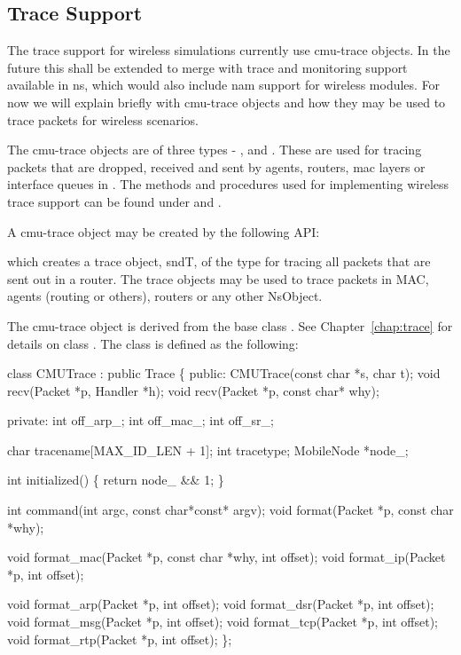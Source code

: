 \subsection{Trace Support}
\label{sec:mobile-trace}

The trace support for wireless simulations currently use cmu-trace
objects. In the future this shall be extended to merge with trace and
monitoring support available in ns, which would also include nam support
for wireless modules. For now we will explain briefly with cmu-trace
objects and how they may be used to trace packets for wireless scenarios. 

The cmu-trace objects are of three types - ,
 and . These are used for tracing
packets that are dropped, received and sent by agents, routers, mac layers
or interface queues in \ns. The methods and procedures used for
implementing wireless trace support can be found under
 and .

A cmu-trace object may be created by the following API:
which creates a trace object, sndT, of the type 
for tracing all packets that are sent out in a router. The trace
objects may be used to trace packets in MAC, agents (routing or
others), routers or any other NsObject. 

The cmu-trace object  is derived from the base class
. See Chapter~\ref{chap:trace} for details on class
. The class  is defined as the following:

\begin{program}
class CMUTrace : public Trace \{
public:
        CMUTrace(const char *s, char t);
        void    recv(Packet *p, Handler *h);
        void    recv(Packet *p, const char* why);

private:
        int off_arp_;
        int off_mac_;
        int off_sr_;

        char    tracename[MAX_ID_LEN + 1];
        int     tracetype;
        MobileNode *node_;

        int initialized() \{ return node_ && 1; \}

        int     command(int argc, const char*const* argv);
        void    format(Packet *p, const char *why);

        void    format_mac(Packet *p, const char *why, int offset);
        void    format_ip(Packet *p, int offset);

        void    format_arp(Packet *p, int offset);
        void    format_dsr(Packet *p, int offset);
        void    format_msg(Packet *p, int offset);
        void    format_tcp(Packet *p, int offset);
        void    format_rtp(Packet *p, int offset);
\};
\end{program}

